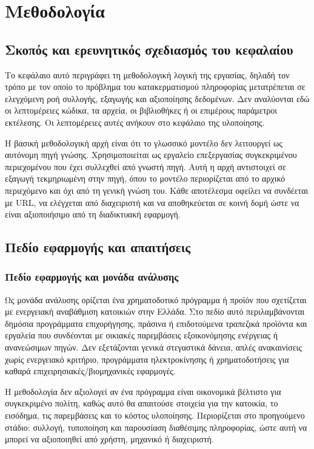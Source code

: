 \chapter{Μεθοδολογία}
\label{chap:methodology}

\section{Σκοπός και ερευνητικός σχεδιασμός του κεφαλαίου}

Το κεφάλαιο αυτό περιγράφει τη μεθοδολογική λογική της εργασίας, δηλαδή τον
τρόπο με τον οποίο το πρόβλημα του κατακερματισμού πληροφορίας μετατρέπεται σε
ελεγχόμενη ροή συλλογής, εξαγωγής και αξιοποίησης δεδομένων. Δεν αναλύονται
εδώ οι λεπτομέρειες κώδικα, τα αρχεία, οι βιβλιοθήκες ή οι επιμέρους
παράμετροι εκτέλεσης. Οι λεπτομέρειες αυτές ανήκουν στο κεφάλαιο της
υλοποίησης.

Η βασική μεθοδολογική αρχή είναι ότι το γλωσσικό μοντέλο δεν λειτουργεί ως
αυτόνομη πηγή γνώσης. Χρησιμοποιείται ως εργαλείο επεξεργασίας συγκεκριμένου
περιεχομένου που έχει συλλεχθεί από γνωστή πηγή. Αυτή η αρχή αντιστοιχεί σε
εξαγωγή τεκμηριωμένη στην πηγή, όπου το μοντέλο περιορίζεται από το αρχικό
περιεχόμενο και όχι από τη γενική γνώση του. Κάθε αποτέλεσμα οφείλει να
συνδέεται με URL, να ελέγχεται από διαχειριστή και να αποθηκεύεται σε κοινή
δομή ώστε να είναι αξιοποιήσιμο από τη διαδικτυακή εφαρμογή.

\section{Πεδίο εφαρμογής και απαιτήσεις}

\subsection{Πεδίο εφαρμογής και μονάδα ανάλυσης}

Ως μονάδα ανάλυσης ορίζεται ένα χρηματοδοτικό πρόγραμμα ή προϊόν που σχετίζεται
με ενεργειακή αναβάθμιση κατοικιών στην Ελλάδα. Στο πεδίο αυτό περιλαμβάνονται
δημόσια προγράμματα επιχορήγησης, πράσινα ή επιδοτούμενα τραπεζικά προϊόντα
και εργαλεία που συνδέονται με οικιακές παρεμβάσεις εξοικονόμησης ενέργειας ή
ανανεώσιμων πηγών. Δεν εξετάζονται γενικά στεγαστικά δάνεια, απλές
ανακαινίσεις χωρίς ενεργειακό κριτήριο, προγράμματα ηλεκτροκίνησης ή
χρηματοδοτήσεις για καθαρά επιχειρησιακές/βιομηχανικές εφαρμογές.

Η μεθοδολογία δεν αξιολογεί αν ένα πρόγραμμα είναι οικονομικά βέλτιστο για
συγκεκριμένο πολίτη, καθώς αυτό θα απαιτούσε στοιχεία για την κατοικία, το
εισόδημα, τις παρεμβάσεις και το κόστος υλοποίησης. Περιορίζεται στο προηγούμενο
στάδιο: συλλογή, τυποποίηση και παρουσίαση διαθέσιμης πληροφορίας, ώστε αυτή να
μπορεί να αξιοποιηθεί από χρήστη, μηχανικό ή διαχειριστή.

